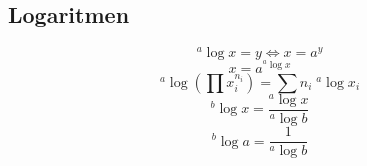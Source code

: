 
\subsection{Logaritmen}
\label{sec:Logaritmen}
\[
  ^a\log x = y \Leftrightarrow x = a^y
\]
\[
  x = a^{^a\log x}
\]
\[
 ^a\log \left( \prod x_i^{n_i} \right) = \sum n_i\;^a\log x_i
\]
\[
 ^b\log x = \frac{^a\log x}{^a\log b}
\]
\[
 ^b\log a = \frac{1}{^a \log b}
\]
